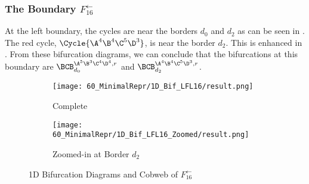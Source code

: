 \subsubsection{The Boundary $F_{16}^\leftarrow$}

At the left boundary, the cycles are near the borders $d_0$ and $d_2$ as can be seen in .
The red cycle, $\Cycle{\A^4\B^4\C^5\D^3}$, is near the border $d_2$.
This is enhanced in .
From these bifurcation diagrams, we can conclude that the bifurcations at this boundary are $\BCB_{d_0}^{\A^5\B^3\C^4\D^4, r}$ and $\BCB_{d_2}^{\A^4\B^4\C^5\D^3, r}$.

\begin{figure}
    \centering
    \begin{subfigure}{0.4\textwidth}
        \centering
        \texttt{[image: 60\_MinimalRepr/1D\_Bif\_LFL16/result.png]}
        \caption{Complete}
        \label{fig:final.bifurcation.F.left}
    \end{subfigure}
    \begin{subfigure}{0.4\textwidth}
        \centering
        \texttt{[image: 60\_MinimalRepr/1D\_Bif\_LFL16\_Zoomed/result.png]}
        \caption{Zoomed-in at Border $d_2$}
        \label{fig:final.bifurcation.F.left.zoomed}
    \end{subfigure}
    \caption{1D Bifurcation Diagrams and Cobweb of $F_{16}^\leftarrow$}
\end{figure}


